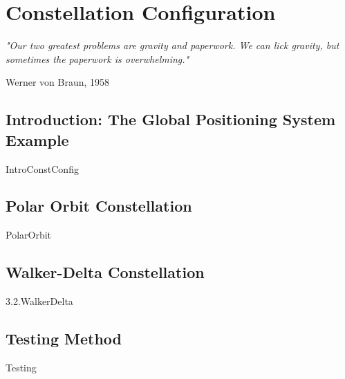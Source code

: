 \chapter{Constellation Configuration}

\epigraph{\textit{"Our two greatest problems are gravity and paperwork. We can lick gravity, but sometimes the paperwork is overwhelming."}}{Werner von Braun, 1958} 

\section{Introduction: The Global Positioning System Example}
{IntroConstConfig}

\section{Polar Orbit Constellation}
{PolarOrbit}

\section{Walker-Delta Constellation}
{3.2.WalkerDelta}

\section{Testing Method}
{Testing}

